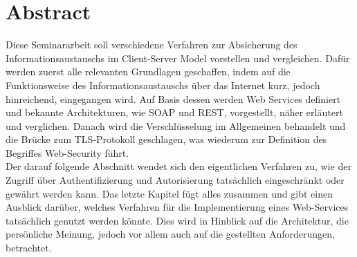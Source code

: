 \section*{Abstract}

	Diese Seminararbeit soll verschiedene Verfahren zur Absicherung des Informationsaustauschs
	im Client-Server Model vorstellen und vergleichen.
	Dafür werden zuerst alle relevanten Grundlagen geschaffen,
	indem auf die Funktionsweise des Informationsaustauschs über das Internet kurz,
	jedoch hinreichend,
	eingegangen wird.
	Auf Basis dessen werden Web Services definiert und bekannte Architekturen,
	wie SOAP und REST,
	vorgestellt, näher erläutert und verglichen.
	Danach wird die Verschlüsselung im Allgemeinen behandelt
	und die Brücke zum TLS-Protokoll geschlagen,
	was wiederum zur Definition des Begriffes Web-Security führt.
	\\
	Der darauf folgende Abschnitt wendet sich den eigentlichen Verfahren zu,
	wie der Zugriff über Authentifizierung und Autorisierung tatsächlich eingeschränkt oder gewährt werden kann.
	Das letzte Kapitel fügt alles zusammen
	und gibt einen Ausblick darüber,
	welches Verfahren für die Implementierung eines Web-Services tatsächlich genutzt werden könnte.
	Dies wird in Hinblick auf die Architektur,
	die persönliche Meinung,
	jedoch vor allem auch auf die gestellten Anforderungen,
	betrachtet.